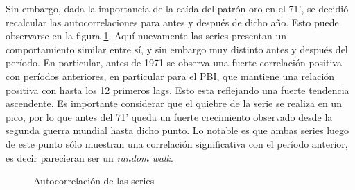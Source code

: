 \documentclass[a4paper]{article}
\begin{document}
Sin embargo, dada la importancia de la caída del patrón oro en el 71', se decidió recalcular las autocorrelaciones para antes y después de dicho año. Esto puede observarse en la figura \ref{fig:autocorrelacion_grp}. Aquí nuevamente las series presentan un comportamiento similar entre sí, y sin embargo muy distinto antes y después del período. En particular, antes de 1971 se observa una fuerte correlación positiva con períodos anteriores, en particular para el PBI, que mantiene una relación positiva con hasta los 12 primeros lags. Esto esta reflejando una fuerte tendencia ascendente. Es importante considerar que el quiebre de la serie se realiza en un pico, por lo que antes del 71' queda un fuerte crecimiento observado desde la segunda guerra mundial hasta dicho punto. Lo notable es que ambas series luego de este punto sólo muestran una correlación significativa con el período anterior, es decir parecieran ser un \textit{random walk}.


\begin{figure}[H]
	\centering
	\caption{Autocorrelación de las series} \label{fig:autocorrelacion_grp}
\end{figure}
\end{document}
